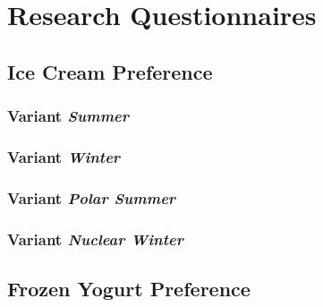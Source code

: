 \chapter{Research Questionnaires}
\label{ch:appendix.a}


\section{Ice Cream Preference}
\label{ch:appendix.a.ice-cream}

\subsection{Variant \emph{Summer}}

\subsection{Variant \emph{Winter}}

\subsection{Variant \emph{Polar Summer}}

\subsection{Variant \emph{Nuclear Winter}}


\section{Frozen Yogurt Preference}
